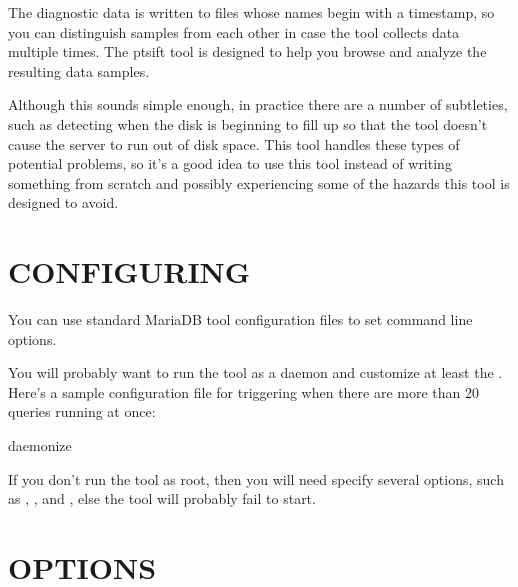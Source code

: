 \documentclass[letterpaper,10pt,english]{sphinxmanual}
\begin{document}
\sphinxAtStartPar
The diagnostic data is written to files whose names begin with a timestamp, so
you can distinguish samples from each other in case the tool collects data
multiple times.  The pt\sphinxhyphen{}sift tool is designed to help you browse and analyze
the resulting data samples.

\sphinxAtStartPar
Although this sounds simple enough, in practice there are a number of
subtleties, such as detecting when the disk is beginning to fill up so that the
tool doesn’t cause the server to run out of disk space.  This tool handles these
types of potential problems, so it’s a good idea to use this tool instead of
writing something from scratch and possibly experiencing some of the hazards
this tool is designed to avoid.


\section{CONFIGURING}
\label{\detokenize{mariadb-stat:configuring}}
\sphinxAtStartPar
You can use standard MariaDB tool configuration files to set command line
options.

\sphinxAtStartPar
You will probably want to run the tool as a daemon and customize at least the
{\hyperref[\detokenize{mariadb-stat:cmdoption-mariadb-stat-threshold}]{}}.  Here’s a sample configuration file for triggering when
there are more than 20 queries running at once:

\begin{sphinxVerbatim}[commandchars=\\\{\}]
daemonize
\end{sphinxVerbatim}

\sphinxAtStartPar
If you don’t run the tool as root, then you will need specify several options,
such as {\hyperref[\detokenize{mariadb-stat:cmdoption-mariadb-stat-pid}]{}}, {\hyperref[\detokenize{mariadb-stat:cmdoption-mariadb-stat-log}]{}}, and {\hyperref[\detokenize{mariadb-stat:cmdoption-mariadb-stat-dest}]{}}, else the tool will probably
fail to start.


\section{OPTIONS}
\label{\detokenize{mariadb-stat:options}}
\end{document}
